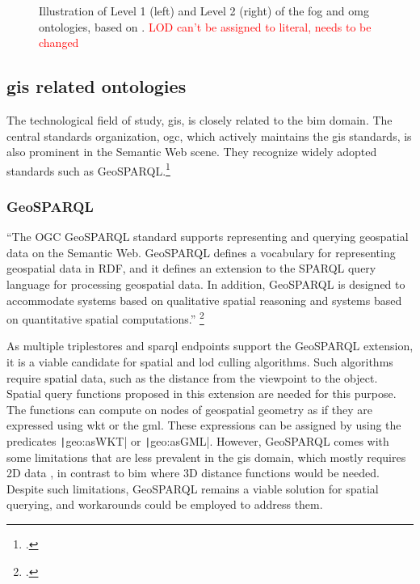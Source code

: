 \begin{figure}[H]
    \begin{adjustwidth}{-0.8cm}{-0.8cm}
        \centering
        \ttfamily
        
        \vspace{-0.3cm}
        \caption[Illustration of the \acs{fog} and \acs{omg} ontologies]{Illustration of Level 1 (left) and Level 2 (right) of the \acs{fog} and \acs{omg} ontologies, based on \cite{Bonduel2019}. \textcolor{red}{LOD can't be assigned to literal, needs to be changed}}
        \label{fig:fogGom}
    \end{adjustwidth}
\end{figure}

\subsection{\acs{gis} related ontologies}
The technological field of study, \acf{gis}, is closely related to the \ac{bim} domain. The central standards organization, \ac{ogc}, which actively maintains the \ac{gis} standards, is also prominent in the Semantic Web scene. They recognize widely adopted standards such as GeoSPARQL.\footcite{OGC2023SW}

\subsubsection{GeoSPARQL}
\enquote{The OGC GeoSPARQL standard supports representing and querying geospatial data on the Semantic Web. GeoSPARQL defines a vocabulary for representing geospatial data in RDF, and it defines an extension to the SPARQL query language for processing geospatial data. In addition, GeoSPARQL is designed to accommodate systems based on qualitative spatial reasoning and systems based on quantitative spatial computations.} \footcite{OGC2023}

As multiple triplestores and \ac{sparql} endpoints support the GeoSPARQL extension, it is a viable candidate for spatial and \ac{lod} culling algorithms. Such algorithms require spatial data, such as the distance from the viewpoint to the object. Spatial query functions proposed in this extension are needed for this purpose. The functions can compute on nodes of geospatial geometry as if they are expressed using \ac{wkt} or the \ac{gml}. These expressions can be assigned by using the predicates \texttt|geo:asWKT| or \texttt|geo:asGML|. However, GeoSPARQL comes with some limitations that are less prevalent in the \ac{gis} domain, which mostly requires 2D data \parencite{perry2012ogc}, in contrast to \ac{bim} where 3D distance functions would be needed. Despite such limitations, GeoSPARQL remains a viable solution for spatial querying, and workarounds could be employed to address them.


